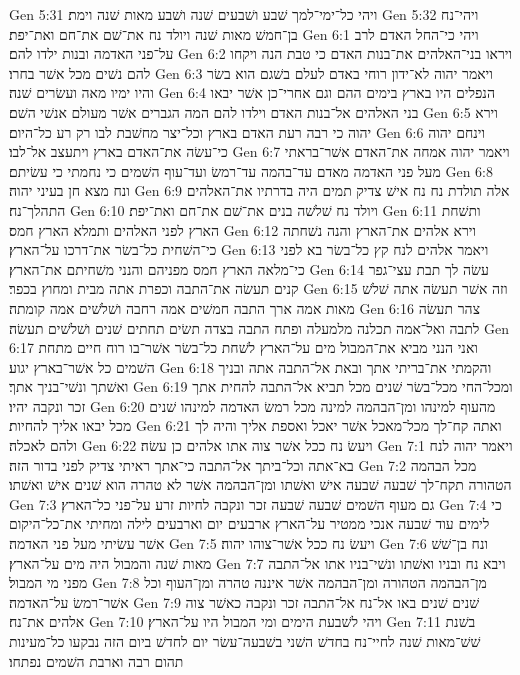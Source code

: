 Gen 5:31  ויהי כל־ימי־למך שׁבע ושׁבעים שׁנה ושׁבע מאות שׁנה וימת׃
Gen 5:32  ויהי־נח בן־חמשׁ מאות שׁנה ויולד נח את־שׁם את־חם ואת־יפת׃
Gen 6:1  ויהי כי־החל האדם לרב על־פני האדמה ובנות ילדו להם׃
Gen 6:2  ויראו בני־האלהים את־בנות האדם כי טבת הנה ויקחו להם נשׁים מכל אשׁר בחרו׃
Gen 6:3  ויאמר יהוה לא־ידון רוחי באדם לעלם בשׁגם הוא בשׂר והיו ימיו מאה ועשׂרים שׁנה׃
Gen 6:4  הנפלים היו בארץ בימים ההם וגם אחרי־כן אשׁר יבאו בני האלהים אל־בנות האדם וילדו להם המה הגברים אשׁר מעולם אנשׁי השׁם׃
Gen 6:5  וירא יהוה כי רבה רעת האדם בארץ וכל־יצר מחשׁבת לבו רק רע כל־היום׃
Gen 6:6  וינחם יהוה כי־עשׂה את־האדם בארץ ויתעצב אל־לבו׃
Gen 6:7  ויאמר יהוה אמחה את־האדם אשׁר־בראתי מעל פני האדמה מאדם עד־בהמה עד־רמשׂ ועד־עוף השׁמים כי נחמתי כי עשׂיתם׃
Gen 6:8  ונח מצא חן בעיני יהוה׃
Gen 6:9  אלה תולדת נח נח אישׁ צדיק תמים היה בדרתיו את־האלהים התהלך־נח׃
Gen 6:10  ויולד נח שׁלשׁה בנים את־שׁם את־חם ואת־יפת׃
Gen 6:11  ותשׁחת הארץ לפני האלהים ותמלא הארץ חמס׃
Gen 6:12  וירא אלהים את־הארץ והנה נשׁחתה כי־השׁחית כל־בשׂר את־דרכו על־הארץ׃
Gen 6:13  ויאמר אלהים לנח קץ כל־בשׂר בא לפני כי־מלאה הארץ חמס מפניהם והנני משׁחיתם את־הארץ׃
Gen 6:14  עשׂה לך תבת עצי־גפר קנים תעשׂה את־התבה וכפרת אתה מבית ומחוץ בכפר׃
Gen 6:15  וזה אשׁר תעשׂה אתה שׁלשׁ מאות אמה ארך התבה חמשׁים אמה רחבה ושׁלשׁים אמה קומתה׃
Gen 6:16  צהר תעשׂה לתבה ואל־אמה תכלנה מלמעלה ופתח התבה בצדה תשׂים תחתים שׁנים ושׁלשׁים תעשׂה׃
Gen 6:17  ואני הנני מביא את־המבול מים על־הארץ לשׁחת כל־בשׂר אשׁר־בו רוח חיים מתחת השׁמים כל אשׁר־בארץ יגוע׃
Gen 6:18  והקמתי את־בריתי אתך ובאת אל־התבה אתה ובניך ואשׁתך ונשׁי־בניך אתך׃
Gen 6:19  ומכל־החי מכל־בשׂר שׁנים מכל תביא אל־התבה להחית אתך זכר ונקבה יהיו׃
Gen 6:20  מהעוף למינהו ומן־הבהמה למינה מכל רמשׂ האדמה למינהו שׁנים מכל יבאו אליך להחיות׃
Gen 6:21  ואתה קח־לך מכל־מאכל אשׁר יאכל ואספת אליך והיה לך ולהם לאכלה׃
Gen 6:22  ויעשׂ נח ככל אשׁר צוה אתו אלהים כן עשׂה׃
Gen 7:1  ויאמר יהוה לנח בא־אתה וכל־ביתך אל־התבה כי־אתך ראיתי צדיק לפני בדור הזה׃
Gen 7:2  מכל הבהמה הטהורה תקח־לך שׁבעה שׁבעה אישׁ ואשׁתו ומן־הבהמה אשׁר לא טהרה הוא שׁנים אישׁ ואשׁתו׃
Gen 7:3  גם מעוף השׁמים שׁבעה שׁבעה זכר ונקבה לחיות זרע על־פני כל־הארץ׃
Gen 7:4  כי לימים עוד שׁבעה אנכי ממטיר על־הארץ ארבעים יום וארבעים לילה ומחיתי את־כל־היקום אשׁר עשׂיתי מעל פני האדמה׃
Gen 7:5  ויעשׂ נח ככל אשׁר־צוהו יהוה׃
Gen 7:6  ונח בן־שׁשׁ מאות שׁנה והמבול היה מים על־הארץ׃
Gen 7:7  ויבא נח ובניו ואשׁתו ונשׁי־בניו אתו אל־התבה מפני מי המבול׃
Gen 7:8  מן־הבהמה הטהורה ומן־הבהמה אשׁר איננה טהרה ומן־העוף וכל אשׁר־רמשׂ על־האדמה׃
Gen 7:9  שׁנים שׁנים באו אל־נח אל־התבה זכר ונקבה כאשׁר צוה אלהים את־נח׃
Gen 7:10  ויהי לשׁבעת הימים ומי המבול היו על־הארץ׃
Gen 7:11  בשׁנת שׁשׁ־מאות שׁנה לחיי־נח בחדשׁ השׁני בשׁבעה־עשׂר יום לחדשׁ ביום הזה נבקעו כל־מעינות תהום רבה וארבת השׁמים נפתחו׃
